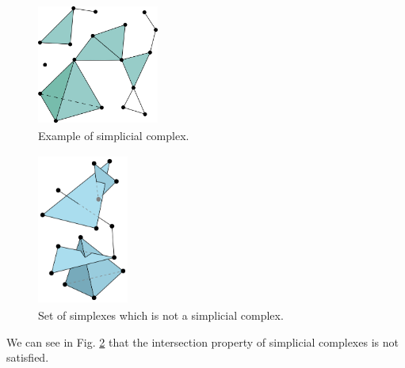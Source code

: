 \documentclass[../1.tex]{subfiles}
\begin{document}
    
    \begin{figure}[h]
        \centering
        \includegraphics[width=4cm, height=4cm]{sections/1/complex}
        \caption{Example of simplicial complex.}
        \label{fig:1}
    \end{figure} 

    \begin{figure}[h]
        \centering
        \includegraphics[width=3cm, height=5cm]{sections/1/noncomplex}
        \caption{Set of simplexes which is not a simplicial complex.}
        \label{fig:2}
    \end{figure}

    We can see in Fig. \ref{fig:2} that the intersection property of simplicial complexes is not satisfied.\\
    \hfill \\


\end{document}
